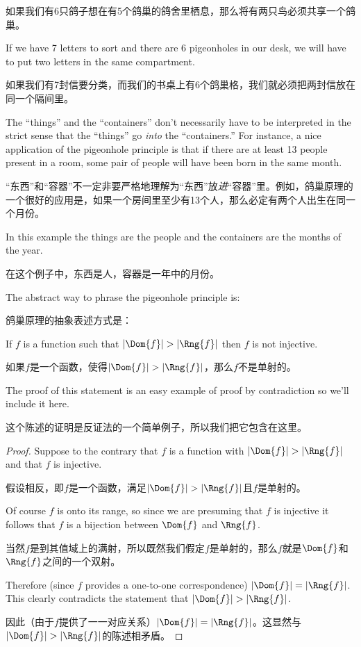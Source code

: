如果我们有6只鸽子想在有5个鸽巢的鸽舍里栖息，那么将有两只鸟必须共享一个鸽巢。

If we have 7 letters to sort and there are 6 pigeonholes in our desk, we
will have to put two letters in the same compartment.

如果我们有7封信要分类，而我们的书桌上有6个鸽巢格，我们就必须把两封信放在同一个隔间里。

The ``things'' and the ``containers'' don't necessarily have to be 
interpreted in the strict sense that the ``things'' go \emph{into} 
the ``containers.''
For instance, a nice application of the pigeonhole principle is that 
if there are at least 13 people present in a room, some pair of people 
will have been born in the same month.

“东西”和“容器”不一定非要严格地理解为“东西”放\emph{进}“容器”里。例如，鸽巢原理的一个很好的应用是，如果一个房间里至少有13个人，那么必定有两个人出生在同一个月份。

In this example the things are the
people and the containers are the months of the year.

在这个例子中，东西是人，容器是一年中的月份。

The abstract way to phrase the pigeonhole principle is:

鸽巢原理的抽象表述方式是：

\begin{thm}
If $f$ is a function such that $|\Dom{f}| > |\Rng{f}|$ then $f$ is not
injective.
\end{thm}

\begin{thm}
如果$f$是一个函数，使得$|\Dom{f}| > |\Rng{f}|$，那么$f$不是单射的。
\end{thm}

The proof of this statement is an easy example of proof by contradiction
so we'll include it here.

这个陈述的证明是反证法的一个简单例子，所以我们把它包含在这里。

\begin{proof}
Suppose to the contrary that $f$ is a function with 
$|\Dom{f}| > |\Rng{f}|$ and that $f$ is injective.

假设相反，即$f$是一个函数，满足$|\Dom{f}| > |\Rng{f}|$且$f$是单射的。

Of course
$f$ is onto its range, so since we are presuming that $f$ is injective
it follows that $f$ is a bijection between $\Dom{f}$ and $\Rng{f}$.

当然$f$是到其值域上的满射，所以既然我们假定$f$是单射的，那么$f$就是$\Dom{f}$和$\Rng{f}$之间的一个双射。

Therefore (since $f$ provides a one-to-one
correspondence) $|\Dom{f}| = |\Rng{f}|$.  This clearly contradicts the
statement that $|\Dom{f}| > |\Rng{f}|$.

因此（由于$f$提供了一一对应关系）$|\Dom{f}| = |\Rng{f}|$。这显然与$|\Dom{f}| > |\Rng{f}|$的陈述相矛盾。
\end{proof}

